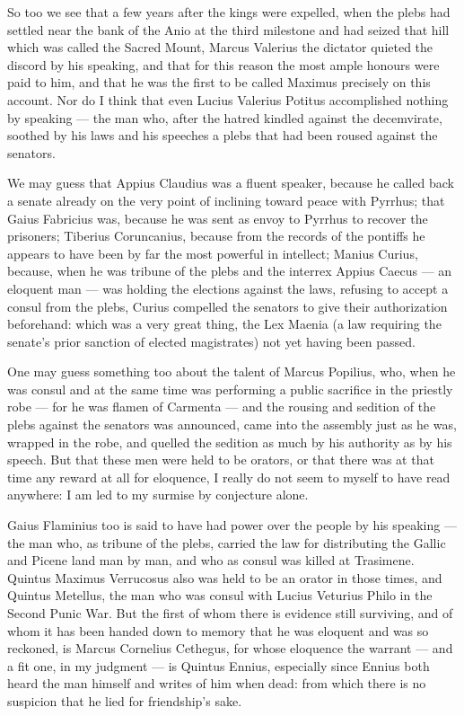 So too we see that a few years after the kings were expelled, when the plebs had settled near the bank of the Anio at the third milestone and had seized that hill which was called the Sacred Mount, Marcus Valerius the dictator quieted the discord by his speaking, and that for this reason the most ample honours were paid to him, and that he was the first to be called Maximus precisely on this account. Nor do I think that even Lucius Valerius Potitus accomplished nothing by speaking — the man who, after the hatred kindled against the decemvirate, soothed by his laws and his speeches a plebs that had been roused against the senators.

 We may guess that Appius Claudius was a fluent speaker, because he called back a senate already on the very point of inclining toward peace with Pyrrhus; that Gaius Fabricius was, because he was sent as envoy to Pyrrhus to recover the prisoners; Tiberius Coruncanius, because from the records of the pontiffs he appears to have been by far the most powerful in intellect; Manius Curius, because, when he was tribune of the plebs and the interrex Appius Caecus — an eloquent man — was holding the elections against the laws, refusing to accept a consul from the plebs, Curius compelled the senators to give their authorization beforehand: which was a very great thing, the Lex Maenia (a law requiring the senate's prior sanction of elected magistrates) not yet having been passed.

 One may guess something too about the talent of Marcus Popilius, who, when he was consul and at the same time was performing a public sacrifice in the priestly robe — for he was flamen of Carmenta — and the rousing and sedition of the plebs against the senators was announced, came into the assembly just as he was, wrapped in the robe, and quelled the sedition as much by his authority as by his speech. But that these men were held to be orators, or that there was at that time any reward at all for eloquence, I really do not seem to myself to have read anywhere: I am led to my surmise by conjecture alone.

 Gaius Flaminius too is said to have had power over the people by his speaking — the man who, as tribune of the plebs, carried the law for distributing the Gallic and Picene land man by man, and who as consul was killed at Trasimene. Quintus Maximus Verrucosus also was held to be an orator in those times, and Quintus Metellus, the man who was consul with Lucius Veturius Philo in the Second Punic War. But the first of whom there is evidence still surviving, and of whom it has been handed down to memory that he was eloquent and was so reckoned, is Marcus Cornelius Cethegus, for whose eloquence the warrant — and a fit one, in my judgment — is Quintus Ennius, especially since Ennius both heard the man himself and writes of him when dead: from which there is no suspicion that he lied for friendship's sake.

